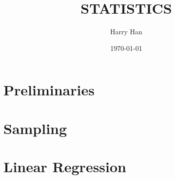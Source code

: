 \documentclass[12pt, a4paper]{report}
\title{
	STATISTICS\\
	\large{}
}
\author{Harry Han}
\date{\today}
\begin{document}
\maketitle
\tableofcontents

\chapter{Preliminaries}


\chapter{Sampling}


\chapter{Linear Regression}

\end{document}
